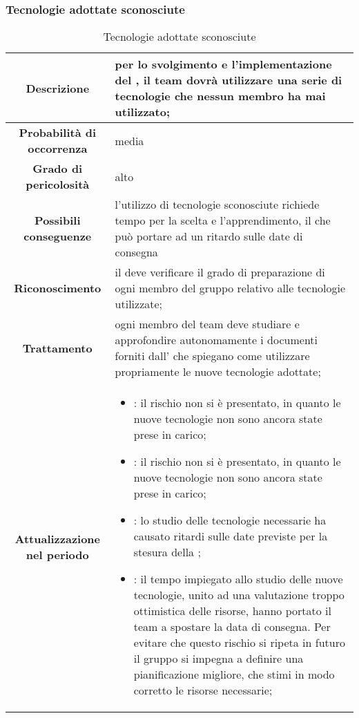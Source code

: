 \documentclass[PianoDiProgetto.tex]{subfiles}
\begin{document}
		\subsubsection{Tecnologie adottate sconosciute}
			\label{sec:tas}
	\begin{table}[h]
		\begin{center}
			\begin{tabular}{ | c | p{10cm} |}
				\hline
					\textbf{Descrizione}& per lo svolgimento e l'implementazione del \gl{progetto}, il team dovrà utilizzare una serie di tecnologie che nessun membro ha mai utilizzato; \\ \hline
				\textbf{Probabilità di occorrenza} & media  \\ \hline
				\textbf{Grado di pericolosità} & alto \\ \hline
				\textbf{Possibili conseguenze} & l'utilizzo di tecnologie sconosciute richiede tempo per la scelta e l'apprendimento, il che può portare ad un ritardo sulle date di consegna \\ \hline
				\textbf{Riconoscimento} & il \RESP{} deve verificare il grado di preparazione di ogni membro del gruppo relativo alle tecnologie utilizzate; \\ \hline
				\textbf{Trattamento} &  ogni membro del team deve studiare e approfondire autonomamente i documenti forniti dall'\AMM{} che spiegano come utilizzare propriamente le nuove tecnologie adottate; \\ \hline
				\textbf{Attualizzazione nel periodo} & \begin{itemize} 
				\item \PerAR: il rischio non si è presentato, in quanto le nuove tecnologie non sono ancora state prese in carico;
				\item \PerAD: il rischio non si è presentato, in quanto le nuove tecnologie non sono ancora state prese in carico;
				\item \PerPA: lo studio delle tecnologie necessarie ha causato ritardi sulle date previste per la stesura della \DPdoc{};
				\item \PerPD: il tempo impiegato allo studio delle nuove tecnologie, unito ad una valutazione troppo ottimistica delle risorse, hanno portato il team a spostare la data di consegna. Per evitare che questo rischio si ripeta in futuro il gruppo si impegna a definire una pianificazione migliore, che stimi in modo corretto le risorse necessarie;
				\end{itemize} \\
				\hline
				
			\end{tabular}
		\caption{Tecnologie adottate sconosciute}
		\end{center}	
	\end{table}
\end{document}

